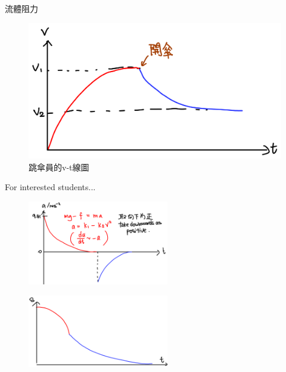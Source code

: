 \documentclass[beamer=true]{standalone}
\begin{document}
\begin{frame}{流體阻力}
    \begin{figure}[h!]
        \centering
        \includegraphics[width=.8\textwidth]{assets/7930445f.png}
        \caption{跳傘員的v-t線圖}
    \end{figure}
\end{frame}
\begin{frame}{For interested students...}
    \begin{figure}[h!]
        \centering
        \includegraphics[width=0.55\textwidth]{assets/eda84940.png}
    \end{figure}
    \begin{figure}[h!]
        \centering
        \includegraphics[width=0.55\textwidth]{assets/6689e5f4.png}
    \end{figure}
\end{frame}
\end{document}
